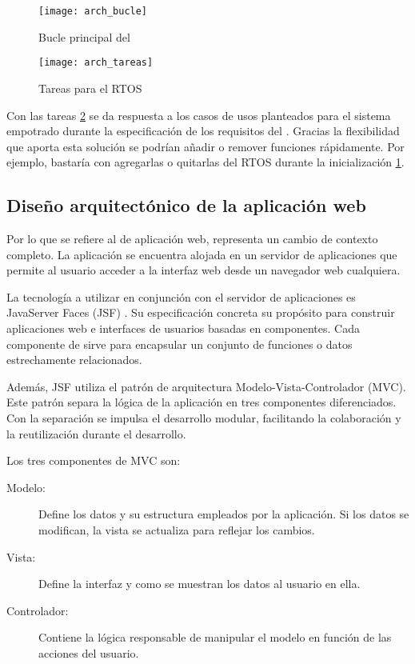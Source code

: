 \begin{figure}[!h]
  \centering
  \texttt{[image: arch\_bucle]}
  \caption{Bucle principal del \sw{}} \label{fig:bucle}
\end{figure}

\begin{figure}[!h]
  \centering
  \texttt{[image: arch\_tareas]}
  \caption{Tareas para el RTOS} \label{fig:tareas}
\end{figure}

Con las tareas \ref{fig:tareas} se da respuesta a los casos de usos planteados
para el sistema empotrado durante la especificación de los requisitos del \sw{}.
Gracias la flexibilidad que aporta esta solución se podrían añadir o remover
funciones rápidamente. Por ejemplo, bastaría con agregarlas o quitarlas del 
RTOS durante la inicialización \ref{fig:bucle}.


\subsection{Diseño arquitectónico de la aplicación web} \label{sec:arch-aw}
Por lo que se refiere al \sw{} de aplicación web, representa un cambio de
contexto completo. La aplicación se encuentra alojada en un servidor de
aplicaciones que permite al usuario acceder a la interfaz web desde un
navegador web cualquiera.

La tecnología a utilizar en conjunción con el servidor de aplicaciones es
JavaServer Faces (JSF) \cite{webpage:jsf}. Su especificación concreta su
propósito para construir aplicaciones web e interfaces de usuarios basadas
en componentes. Cada componente de \sw{} sirve para encapsular un conjunto
de funciones o datos estrechamente relacionados.

Además, JSF utiliza el patrón de arquitectura Modelo-Vista-Controlador (MVC).
Este patrón separa la lógica de la aplicación en tres componentes diferenciados.
Con la separación se impulsa el desarrollo modular, facilitando la colaboración
y la reutilización durante el desarrollo.

Los tres componentes de MVC son:
\begin{description}
  \item[Modelo:] Define los datos y su estructura empleados por la aplicación.
  Si los datos se modifican, la vista se actualiza para reflejar los cambios.
  \item[Vista:] Define la interfaz y como se muestran los datos al usuario
  en ella.
  \item[Controlador:] Contiene la lógica responsable de manipular el modelo
  en función de las acciones del usuario.
\end{description}

